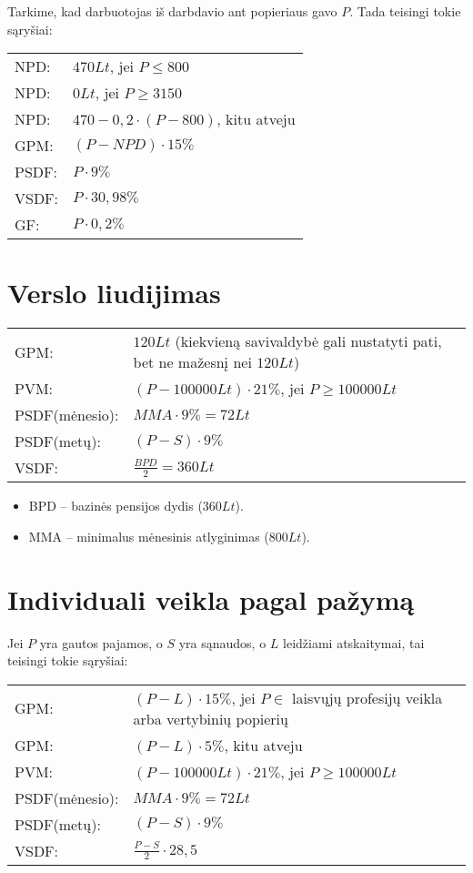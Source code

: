 Tarkime, kad darbuotojas iš darbdavio ant popieriaus gavo $P$. Tada
teisingi tokie sąryšiai:

\begin{tabularx}{15cm}{p{7.5cm}|p{7.5cm}}
  NPD: & $470 Lt$, jei $P \leq 800$ \\
  NPD: & $0 Lt$, jei $P \geq 3150$ \\
  NPD: & $470 - 0,2 \cdot (P - 800)$, kitu atveju \\
  GPM: & $(P - NPD) \cdot 15\%$ \\
  PSDF: & $P \cdot 9\%$ \\
  VSDF: & $P \cdot 30,98\%$ \\
  GF: & $P \cdot 0,2\%$ \\
\end{tabularx}

\section{Verslo liudijimas}

\begin{tabularx}{15cm}{p{7.5cm}|p{7.5cm}}
  GPM: & $120 Lt$ (kiekvieną savivaldybė gali nustatyti pati, bet ne
    mažesnį nei $120 Lt$) \\
  PVM: & $(P - 100 000 Lt) \cdot 21\%$, jei $P \geq 100 000 Lt$ \\
  PSDF(mėnesio): & $MMA \cdot 9\% = 72 Lt$ \\
  PSDF(metų): & $(P - S) \cdot 9\%$ \\
  VSDF: & $\frac{BPD}{2} = 360 Lt$ \\
\end{tabularx}

\begin{itemize}
  \item BPD – bazinės pensijos dydis ($360 Lt$).
  \item MMA – minimalus mėnesinis atlyginimas ($800Lt$).
\end{itemize}

\section{Individuali veikla pagal pažymą}

Jei $P$ yra gautos pajamos, o $S$ yra sąnaudos, o $L$ leidžiami
atskaitymai, tai teisingi tokie sąryšiai:

\begin{tabularx}{15cm}{p{7.5cm}|p{7.5cm}}
  GPM: & $(P - L) \cdot 15\%$, jei $P \in$ laisvųjų profesijų veikla arba
    vertybinių popierių \\
  GPM: & $(P - L) \cdot 5\%$, kitu atveju \\
  PVM: & $(P - 100 000 Lt) \cdot 21\%$, jei $P \geq 100 000 Lt$ \\
  PSDF(mėnesio): & $MMA \cdot 9\% = 72 Lt$ \\
  PSDF(metų): & $(P - S) \cdot 9\%$ \\
  VSDF: & $\frac{P-S}{2} \cdot 28,5$ \\
\end{tabularx}
